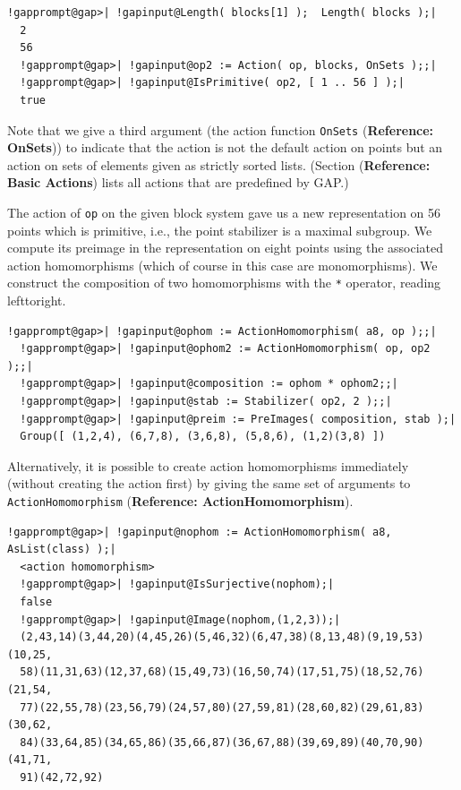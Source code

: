 \documentclass[a4paper,11pt]{report}
\begin{document}
{{ 
\begin{Verbatim}[commandchars=!@|,fontsize=\small,frame=single,label=Example]
  !gapprompt@gap>| !gapinput@Length( blocks[1] );  Length( blocks );|
  2
  56
  !gapprompt@gap>| !gapinput@op2 := Action( op, blocks, OnSets );;|
  !gapprompt@gap>| !gapinput@IsPrimitive( op2, [ 1 .. 56 ] );|
  true
\end{Verbatim}
 

 Note that we give a third argument (the action function \texttt{OnSets} (\textbf{Reference: OnSets})) to indicate that the action is not the default action on points but an
action on sets of elements given as strictly sorted lists.
(Section{\nobreakspace} (\textbf{Reference: Basic Actions}) lists all actions that are pre\texttt{}defined by \textsf{GAP}.) 

 The action of \texttt{op} on the given block system gave us a new representation on 56 points which is
primitive, i.e., the point stabilizer is a maximal subgroup. We compute its
preimage in the representation on eight points using the associated action
homomorphisms (which of course in this case are monomorphisms). We construct
the composition of two homomorphisms with the \texttt{*} operator, reading left\texttt{}to\texttt{}right. 

 
\begin{Verbatim}[commandchars=!@|,fontsize=\small,frame=single,label=Example]
  !gapprompt@gap>| !gapinput@ophom := ActionHomomorphism( a8, op );;|
  !gapprompt@gap>| !gapinput@ophom2 := ActionHomomorphism( op, op2 );;|
  !gapprompt@gap>| !gapinput@composition := ophom * ophom2;;|
  !gapprompt@gap>| !gapinput@stab := Stabilizer( op2, 2 );;|
  !gapprompt@gap>| !gapinput@preim := PreImages( composition, stab );|
  Group([ (1,2,4), (6,7,8), (3,6,8), (5,8,6), (1,2)(3,8) ])
\end{Verbatim}
 

 Alternatively, it is possible to create action homomorphisms immediately
(without creating the action first) by giving the same set of arguments to \texttt{ActionHomomorphism} (\textbf{Reference: ActionHomomorphism}). 
\begin{Verbatim}[commandchars=!@|,fontsize=\small,frame=single,label=Example]
  !gapprompt@gap>| !gapinput@nophom := ActionHomomorphism( a8, AsList(class) );|
  <action homomorphism>
  !gapprompt@gap>| !gapinput@IsSurjective(nophom);|
  false
  !gapprompt@gap>| !gapinput@Image(nophom,(1,2,3));|
  (2,43,14)(3,44,20)(4,45,26)(5,46,32)(6,47,38)(8,13,48)(9,19,53)(10,25,
  58)(11,31,63)(12,37,68)(15,49,73)(16,50,74)(17,51,75)(18,52,76)(21,54,
  77)(22,55,78)(23,56,79)(24,57,80)(27,59,81)(28,60,82)(29,61,83)(30,62,
  84)(33,64,85)(34,65,86)(35,66,87)(36,67,88)(39,69,89)(40,70,90)(41,71,
  91)(42,72,92)
\end{Verbatim}
 

}}
\end{document}
